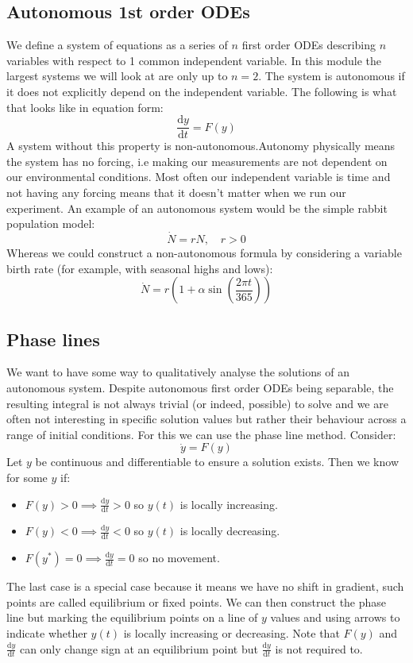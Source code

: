 \documentclass[12pt]{article}
\newcommand{\df}[2]{\frac{\text{d}#1}{\text{d}#2}}
\begin{document}
\subsection*{Autonomous 1st order ODEs}
We define a system of equations as a series of \(n\) first order ODEs describing \(n\) variables with respect to 1 common independent variable. In this module the largest systems we will look at are only up to \(n=2\). The system is autonomous if it does not explicitly depend on the independent variable. The following is what that looks like in equation form:
\[\df{y}{t}=F(y)\]
A system without this property is non-autonomous.Autonomy physically means the system has no forcing, i.e making our measurements are not dependent on our environmental conditions. Most often our independent variable is time and not having any forcing means that it doesn't matter when we run our experiment. An example of an autonomous system would be the simple rabbit population model:
\[\dot{N}=rN,\quad r>0\]
Whereas we could construct a non-autonomous formula by considering a variable birth rate (for example, with seasonal highs and lows):
\[\dot{N}=r\left(1+\alpha\sin\left({\frac{2\pi t}{365}}\right)\right)\]
\subsection*{Phase lines}
We want to have some way to qualitatively analyse the solutions of an autonomous system. Despite autonomous first order ODEs being separable, the resulting integral is not always trivial (or indeed, possible) to solve and we are often not interesting in specific solution values but rather their behaviour across a range of initial conditions. For this we can use the phase line method. Consider:
\[\dot{y}=F(y)\]
Let \(y\) be continuous and differentiable to ensure a solution exists. Then we know for some \(y\) if:
\begin{itemize}
    \item \(F(y)>0\implies \df{y}{t}>0\) so \(y(t)\) is locally increasing.
    \item \(F(y)<0\implies \df{y}{t}<0\) so \(y(t)\) is locally decreasing.
    \item \(F(y^*)=0\implies \df{y}{t}=0\) so no movement.
\end{itemize}
The last case is a special case because it means we have no shift in gradient, such points are called equilibrium or fixed points. We can then construct the phase line but marking the equilibrium points on a line of \(y\) values and using arrows to indicate whether \(y(t)\) is locally increasing or decreasing. Note that \(F(y)\) and \(\df{y}{t}\) can only change sign at an equilibrium point but \(\df{y}{t}\) is not required to.
\end{document}
